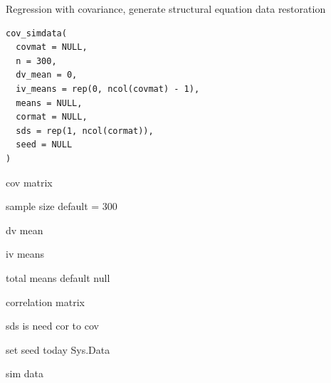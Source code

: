\documentclass[a4paper]{book}
\begin{document}
\begin{Examples}
\end{Examples}
%
\begin{Description}
Regression with covariance, generate structural equation data restoration
\end{Description}
%
\begin{Usage}
\begin{verbatim}
cov_simdata(
  covmat = NULL,
  n = 300,
  dv_mean = 0,
  iv_means = rep(0, ncol(covmat) - 1),
  means = NULL,
  cormat = NULL,
  sds = rep(1, ncol(cormat)),
  seed = NULL
)
\end{verbatim}
\end{Usage}
%
\begin{Arguments}
\begin{ldescription}
\item[\code{covmat}] cov matrix

\item[\code{n}] sample size default = 300

\item[\code{dv\_mean}] dv mean

\item[\code{iv\_means}] iv means

\item[\code{means}] total means default null

\item[\code{cormat}] correlation matrix

\item[\code{sds}] sds is need cor to cov

\item[\code{seed}] set seed today Sys.Data
\end{ldescription}
\end{Arguments}
%
\begin{Value}
sim data
\end{Value}
\end{document}

